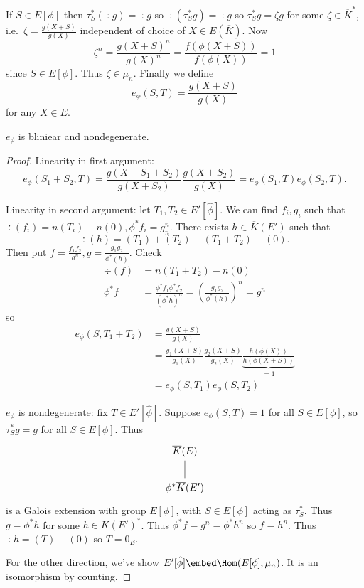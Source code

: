 \documentclass[a4paper]{article}
\theoremstyle{definition}
\begin{document}
If \(S \in E[\phi]\) then \(\tau_S^*(\div g) = \div g\) so \(\div(\tau_S^* g) = \div g\) so \(\tau_S^* g = \zeta g\) for some \(\zeta \in \overline K^*\), i.e.\ \(\zeta = \frac{g(X + S)}{g(X)}\) independent of choice of \(X \in E(\overline K)\). Now
\[
  \zeta^n = \frac{g(X + S)^n}{g(X)^n} = \frac{f(\phi(X + S))}{f(\phi(X))} = 1
\]
since \(S \in E[\phi]\). Thus \(\zeta \in \mu_n\). Finally we define
\[
  e_\phi(S, T) = \frac{g(X + S)}{g(X)}
\]
for any \(X \in E\).

\begin{proposition}
  \(e_\phi\) is bliniear and nondegenerate.
\end{proposition}

\begin{proof}
  Linearity in first argument:
  \[
    e_\phi(S_1 + S_2, T) = \frac{g(X + S_1 + S_2)}{g(X + S_2)} \frac{g(X + S_2)}{g(X)} = e_\phi(S_1, T) e_\phi(S_2, T).
  \]

  Linearity in second argument: let \(T_1, T_2 \in E'[\hat \phi]\). We can find \(f_i, g_i\) such that \(\div (f_i) = n(T_i) - n(0), \phi^* f_i = g_n^n\). There exists \(h \in \overline K(E')\) such that
  \[
    \div (h) = (T_1) + (T_2) - (T_1 + T_2) - (0).
  \]
  Then put \(f = \frac{f_1f_2}{h^n}, g = \frac{g_1g_2}{\phi^*(h)}\). Check
  \begin{align*}
    \div (f) &= n(T_1 + T_2) - n(0) \\
    \phi^*f &= \frac{\phi^*f_1 \phi^* f_2}{(\phi^* h)^n} = \left(\frac{g_1g_2}{\phi^*(h)}\right)^n = g^n
  \end{align*}
  so
  \begin{align*}
    e_\phi(S, T_1 + T_2) &= \frac{g(X + S)}{g(X)} \\
                         &= \frac{g_1(X + S)}{g_1(X)} \frac{g_2(X + S)}{g_2(X)} \underbrace{\frac{h(\phi(X))}{h(\phi(X + S))}}_{= 1} \\
                         &= e_\phi(S, T_1) e_\phi(S, T_2)
  \end{align*}

  \(e_\phi\) is nondegenerate: fix \(T \in E'[\hat \phi]\). Suppose \(e_\phi(S, T) = 1\) for all \(S \in E[\phi]\), so \(\tau_S^*g = g\) for all \(S \in E[\phi]\). Thus
  \[
    \begin{tikzcd}
      \overline K(E) \ar[d, dash] \\
      \phi^*\overline K(E')
    \end{tikzcd}
  \]
  is a Galois extension with group \(E[\phi]\), with \(S \in E[\phi]\) acting as \(\tau_S^*\). Thus \(g = \phi^*h\) for some \(h \in \overline K(E')^*\). Thus \(\phi^*f = g^n = \phi^* h^n\) so \(f = h^n\). Thus \(\div h = (T) - (0)\) so \(T = 0_E\).

  For the other direction, we've show \(E'[\hat \phi] \embed \Hom(E[\phi], \mu_n)\). It is an isomorphism by counting.
\end{proof}
\end{document}

